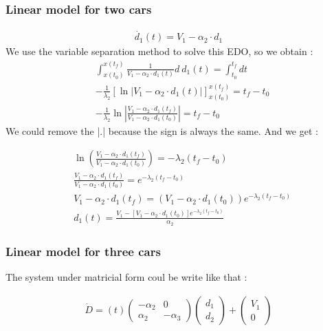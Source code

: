 \documentclass{article}
\begin{document}
	\subsubsection{Linear model for two cars}
	
	\label{eq:EDO1}
	\begin{align*} 
		\dot{d_1}(t) = V_1 - \alpha_2 \cdot d_1
	\end{align*}
	We use the variable separation method to solve this EDO, so we obtain : 
	\begin{align*} 
		&\int_{x(t_0)}^{x(t_f)} \frac{1}{V_1 - \alpha_2 \cdot d_1(t)} d \ d_1(t) = \int_{t_0}^{t_f} dt \\
		&-\frac{1}{\lambda_2} \left[ \ln\left| V_1 - \alpha_2 \cdot d_1(t) \right| \right]_{x(t_0)}^{x(t_f)} = t_f-t_0 \\
		&-\frac{1}{\lambda_2} \ln\left| \frac{V_1 - \alpha_2 \cdot d_1(t_f)}{V_1 - \alpha_2 \cdot d_1(t_0)} \right| = t_f-t_0
	\end{align*}
	We could remove the |.| because the sign is always the same. And we get : 
	
	\begin{align*}
		&\ln\left( \frac{V_1 - \alpha_2 \cdot d_1(t_f)}{V_1 - \alpha_2 \cdot d_1(t_0)} \right)  = -\lambda_2( t_f-t_0)\\
		&\frac{V_1 - \alpha_2 \cdot d_1(t_f)}{V_1 - \alpha_2 \cdot d_1(t_0)}  = e^{-\lambda_2( t_f-t_0)} \\
		&V_1 - \alpha_2 \cdot d_1(t_f)   = (V_1 - \alpha_2 \cdot d_1(t_0))e^{-\lambda_2( t_f-t_0)} \\
		&\boxed{
			d_1(t) = \frac{V_1 - [V_1 - \alpha_2 \cdot d_1(t_0)]e^{-\lambda_2( t_f-t_0)}}{\alpha_2}
		}
	\end{align*}

	\subsubsection{Linear model for three cars}
	\label{eq:EDO2}
	The system under matricial form coul be write like that :
	
	\begin{align*}
		\dot{D}=(t)\begin{pmatrix}
			-\alpha_2 & 0 \\
			\alpha_2 & -\alpha_3
		\end{pmatrix}
		\begin{pmatrix}
			d_1 \\
			d_2
		\end{pmatrix} + 
		\begin{pmatrix}
			V_1 \\
			0
		\end{pmatrix}
	\end{align*}
	
\end{document}
